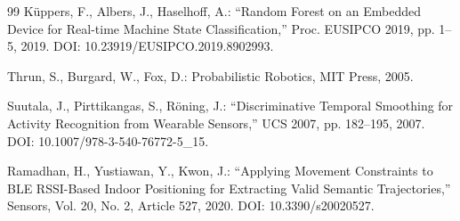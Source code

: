 \documentclass[a4paper,12pt]{jreport}
\begin{document}
\begin{thebibliography}{99}
K\"{u}ppers, F., Albers, J., Haselhoff, A.: ``Random Forest on an Embedded Device for Real-time Machine State Classification,''
Proc. EUSIPCO 2019, pp. 1--5, 2019.
DOI: 10.23919/EUSIPCO.2019.8902993.

Thrun, S., Burgard, W., Fox, D.: Probabilistic Robotics, MIT Press, 2005.

Suutala, J., Pirttikangas, S., R\"{o}ning, J.:
``Discriminative Temporal Smoothing for Activity Recognition from Wearable Sensors,''
UCS 2007, pp. 182--195, 2007.
DOI: 10.1007/978-3-540-76772-5\_15.

Ramadhan, H., Yustiawan, Y., Kwon, J.:
``Applying Movement Constraints to BLE RSSI-Based Indoor Positioning for Extracting Valid Semantic Trajectories,''
Sensors, Vol. 20, No. 2, Article 527, 2020.
DOI: 10.3390/s20020527.

\end{thebibliography}
\end{document}
